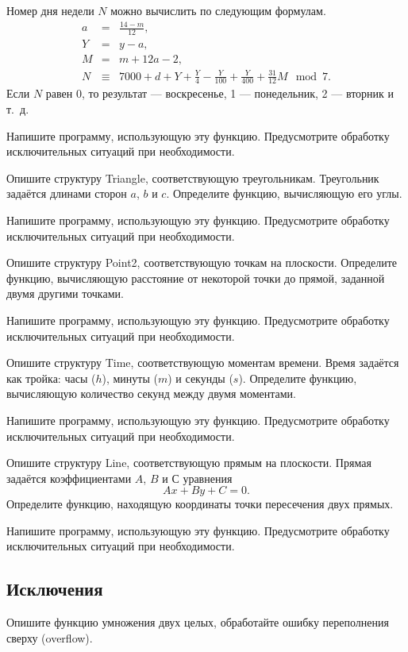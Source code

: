 Номер дня недели $N$ можно вычислить по следующим формулам.
\begin{eqnarray*}
a &=& \frac{14 - m}{12},\\
Y &=& y - a,\\
M &=& m + 12a - 2,\\
N &\equiv& 7000 + d + Y + \frac{Y}{4} - \frac{Y}{100} + \frac{Y}{400} + \frac{31}{12}M \mod 7.
\end{eqnarray*}
Если $N$ равен 0, то результат — воскресенье, 1 — понедельник, 2 —
вторник и т.~д.

Напишите программу, использующую эту функцию. Предусмотрите обработку
исключительных ситуаций при необходимости.

\task Опишите структуру Triangle, соответствующую
треугольникам. Треугольник задаётся длинами сторон $a$, $b$ и $c$.
Определите функцию, вычисляющую его углы.

Напишите программу, использующую эту функцию. Предусмотрите обработку
исключительных ситуаций при необходимости.

\task Опишите структуру Point2, соответствующую точкам на
плоскости. Определите функцию, вычисляющую расстояние от некоторой
точки до прямой, заданной двумя другими точками.

Напишите программу, использующую эту функцию. Предусмотрите обработку
исключительных ситуаций при необходимости.

\task Опишите структуру Time, соответствующую моментам времени. Время
задаётся как тройка: часы ($h$), минуты ($m$) и секунды
($s$). Определите функцию, вычисляющую количество секунд между двумя
моментами.

Напишите программу, использующую эту функцию. Предусмотрите обработку
исключительных ситуаций при необходимости.

\task Опишите структуру Line, соответствующую прямым на
плоскости. Прямая задаётся коэффициентами $A$, $B$ и $С$ уравнения
\[
Ax+By+C=0.
\]
Определите функцию, находящую координаты точки пересечения двух
прямых.

Напишите программу, использующую эту функцию. Предусмотрите обработку
исключительных ситуаций при необходимости.


\subsection{Исключения}

\task Опишите функцию умножения двух целых, обработайте ошибку переполнения сверху (overflow).

